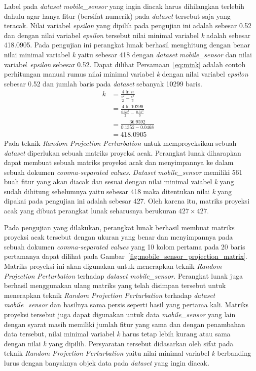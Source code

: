 Label pada \textit{dataset} \textit{mobile\_sensor} yang ingin diacak harus dihilangkan terlebih dahulu agar hanya fitur (bersifat numerik) pada \textit{dataset} tersebut saja yang teracak. Nilai variabel \textit{epsilon} yang dipilih pada pengujian ini adalah sebesar 0.52 dan dengan nilai variabel \textit{epsilon} tersebut nilai minimal variabel \textit{k} adalah sebesar 418.0905. Pada pengujian ini perangkat lunak berhasil menghitung dengan benar nilai minimal variabel \textit{k} yaitu sebesar 418 dengan \textit{dataset} \textit{mobile\_sensor} dan nilai variabel \textit{epsilon} sebesar 0.52. Dapat dilihat Persamaan~\ref{eq:mink} adalah contoh perhitungan manual rumus nilai minimal variabel \textit{k} dengan nilai variabel \textit{epsilon} sebesar 0.52 dan jumlah baris pada \textit{dataset} sebanyak 10299 baris.
\begin{align}
	k &= \frac{4\ln{n}}{\frac{\epsilon^{2}}{2}-\frac{\epsilon^{3}}{3}} \label{eq:mink} \\
	&= \frac{4\ln{10299}}{\frac{0.52^{2}}{2}-\frac{0.52^{3}}{3}} \nonumber \\
	&= \frac{36.9592}{0.1352-0.0468} \nonumber \\
	&= 418.0905 \nonumber
\end{align}
Pada teknik \textit{Random Projection Perturbation} untuk memproyeksikan sebuah \textit{dataset} diperlukan sebuah matriks proyeksi acak. Perangkat lunak diharapkan dapat membuat sebuah matriks proyeksi acak dan menyimpannya ke dalam sebuah dokumen \textit{comma-separated values}. \textit{Dataset} \textit{mobile\_sensor} memiliki 561 buah fitur yang akan diacak dan sesuai dengan nilai minimal vaiabel \textit{k} yang sudah dihitung sebelumnya yaitu sebesar 418 maka ditentukan nilai \textit{k} yang dipakai pada pengujian ini adalah sebesar 427. Oleh karena itu, matriks proyeksi acak yang dibuat perangkat lunak seharusnya berukuran \(427\times427\).

Pada pengujian yang dilakukan, perangkat lunak berhasil membuat matriks proyeksi acak tersebut dengan ukuran yang benar dan menyimpannya pada sebuah dokumen \textit{comma-separated values} yang 10 kolom pertama pada 20 baris pertamanya dapat dilihat pada Gambar~\ref{fig:mobile_sensor_projection_matrix}. Matriks proyeksi ini akan digunakan untuk menerapkan teknik \textit{Random Projection Perturbation} terhadap \textit{dataset} \textit{mobile\_sensor}. Perangkat lunak juga berhasil menggunakan ulang matriks yang telah disimpan tersebut untuk menerapkan teknik \textit{Random Projection Perturbation} terhadap \textit{dataset} \textit{mobile\_sensor} dan hasilnya sama persis seperti hasil yang pertama kali. Matriks proyeksi tersebut juga dapat digunakan untuk data \textit{mobile\_sensor} yang lain dengan syarat masih memiliki jumlah fitur yang sama dan dengan penambahan data tersebut, nilai minimal variabel \textit{k} harus tetap lebih kurang atau sama dengan nilai \textit{k} yang dipilih. Persyaratan tersebut didasarkan oleh sifat pada teknik \textit{Random Projection Perturbation} yaitu nilai minimal variabel \textit{k} berbanding lurus dengan banyaknya objek data pada \textit{dataset} yang ingin diacak.

